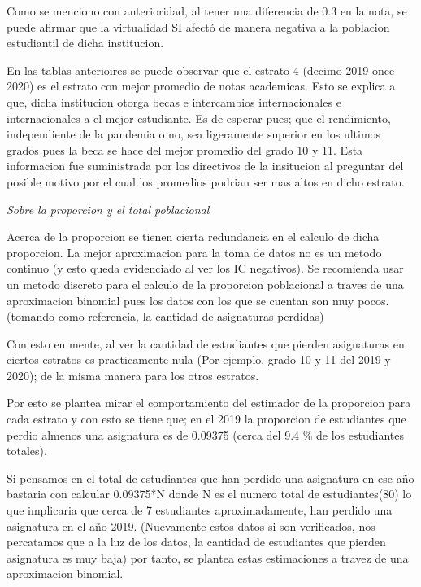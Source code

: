 \documentclass[
]{article}
\begin{document}
Como se menciono con anterioridad, al tener una diferencia de 0.3 en la
nota, se puede afirmar que la virtualidad SI afectó de manera negativa a
la poblacion estudiantil de dicha institucion.

En las tablas anterioires se puede observar que el estrato 4 (decimo
2019-once 2020) es el estrato con mejor promedio de notas academicas.
Esto se explica a que, dicha institucion otorga becas e intercambios
internacionales e internacionales a el mejor estudiante. Es de esperar
pues; que el rendimiento, independiente de la pandemia o no, sea
ligeramente superior en los ultimos grados pues la beca se hace del
mejor promedio del grado 10 y 11. Esta informacion fue suministrada por
los directivos de la insitucion al preguntar del posible motivo por el
cual los promedios podrian ser mas altos en dicho estrato.

\emph{Sobre la proporcion y el total poblacional}

Acerca de la proporcion se tienen cierta redundancia en el calculo de
dicha proporcion. La mejor aproximacion para la toma de datos no es un
metodo continuo (y esto queda evidenciado al ver los IC negativos). Se
recomienda usar un metodo discreto para el calculo de la proporcion
poblacional a traves de una aproximacion binomial pues los datos con los
que se cuentan son muy pocos. (tomando como referencia, la cantidad de
asignaturas perdidas)

Con esto en mente, al ver la cantidad de estudiantes que pierden
asignaturas en ciertos estratos es practicamente nula (Por ejemplo,
grado 10 y 11 del 2019 y 2020); de la misma manera para los otros
estratos.

Por esto se plantea mirar el comportamiento del estimador de la
proporcion para cada estrato y con esto se tiene que; en el 2019 la
proporcion de estudiantes que perdio almenos una asignatura es de
0.09375 (cerca del 9.4 \% de los estudiantes totales).

Si pensamos en el total de estudiantes que han perdido una asignatura en
ese año bastaria con calcular 0.09375*N donde N es el numero total de
estudiantes(80) lo que implicaria que cerca de 7 estudiantes
aproximadamente, han perdido una asignatura en el año 2019. (Nuevamente
estos datos si son verificados, nos percatamos que a la luz de los
datos, la cantidad de estudiantes que pierden asignatura es muy baja)
por tanto, se plantea estas estimaciones a travez de una aproximacion
binomial.
\end{document}
